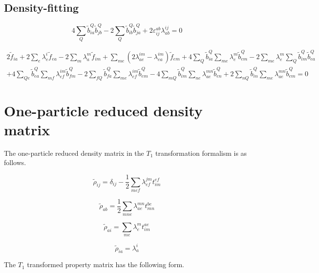 \documentclass{article}
\begin{document}
\subsection{Density-fitting}

\begin{equation}
  4\sum_Q\tilde{b}_{ia}^Q\tilde{b}_{jb}^Q - 2\sum_Q\tilde{b}_{ib}^Q\tilde{b}_{ja}^Q + 2\varepsilon_{ij}^{ab}\lambda_{ab}^{ij} = 0
\end{equation}

\begin{multline}
  2\tilde{f}_{ia} + 2\sum_e\lambda_e^i\tilde{f}_{ea} - 2\sum_m\lambda_a^m\tilde{f}_{im} + \sum_{me}\left(2\lambda_{ae}^{im} - \lambda_{ea}^{im}\right)\tilde{f}_{em} + 4\sum_Q\tilde{b}_{ia}^Q\sum_{me}\lambda_e^m\tilde{b}_{em}^Q - 2\sum_{me}\lambda_e^m\sum_Q\tilde{b}_{im}^Q\tilde{b}_{ea}^Q \\
  + 4\sum_{Qe}\tilde{b}_{ea}^Q\sum_{mf}\lambda_{ef}^{im}\tilde{b}_{fm}^Q - 2\sum_{fQ}\tilde{b}_{fa}^Q\sum_{me}\lambda_{ef}^{im}\tilde{b}_{em}^Q - 4\sum_{mQ}\tilde{b}_{im}^Q\sum_{ne}\lambda_{ae}^{mn}\tilde{b}_{en}^Q + 2\sum_{nQ}\tilde{b}_{in}^Q\sum_{me}\lambda_{ae}^{mn}\tilde{b}_{em}^Q = 0
\end{multline}

\section{One-particle reduced density matrix}

The one-particle reduced density matrix in the $T_1$ transformation formalism is as follows.

\begin{equation}
  \tilde{\rho}_{ij} = \delta_{ij} - \frac{1}{2}\sum_{mef}\lambda_{ef}^{jm}t_{im}^{ef}
\end{equation}

\begin{equation}
  \tilde{\rho}_{ab} = \frac{1}{2}\sum_{mne}\lambda_{ae}^{mn}t_{mn}^{be}
\end{equation}

\begin{equation}
  \tilde{\rho}_{ai} = \sum_{me}\lambda_e^mt_{im}^{ae}
\end{equation}

\begin{equation}
  \tilde{\rho}_{ia} = \lambda_a^i
\end{equation}

The $T_1$ transformed property matrix has the following form.
\end{document}
